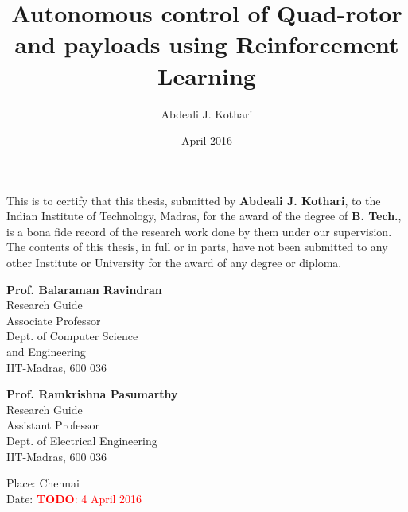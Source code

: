 \documentclass[hidelinks,BTech]{iitmdiss}
\newcommand\todo[1]{\textcolor{red}{{\bf TODO}: #1}}
\begin{document}

\title{Autonomous control of Quad-rotor and payloads using Reinforcement Learning}

\author{Abdeali J. Kothari}

\date{April 2016}

\maketitle

\certificate

\vspace*{0.5in}

\noindent This is to certify that this thesis, submitted by {\bf Abdeali J. Kothari}, to the Indian Institute of Technology, Madras, for the award of the degree of {\bf B. Tech.}, is a bona fide record of the research work done by them under our supervision. The contents of this thesis, in full or in parts, have not been submitted to any other Institute or University for the award of any degree or diploma.

\vspace*{1.5in}

\begin{singlespacing}

\begin{minipage}[t]{0.45\textwidth}
  {\bf Prof. Balaraman Ravindran} \\
  Research Guide \\
  Associate Professor \\
  Dept. of Computer Science \\
  and Engineering \\
  IIT-Madras, 600 036
\end{minipage}
\hfill
\begin{minipage}[t]{0.45\textwidth}
  {\bf Prof. Ramkrishna Pasumarthy} \\
  Research Guide \\
  Assistant Professor \\
  Dept. of Electrical Engineering \\
  IIT-Madras, 600 036
\end{minipage}

\end{singlespacing}

\vspace*{0.25in}
\noindent Place: Chennai\\
Date: \todo{4 April 2016}
\end{document}
